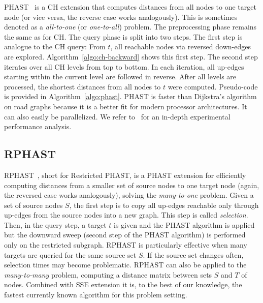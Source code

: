 \documentclass[manuscript,review]{acmart}
\begin{document}
PHAST~\cite{dgnw-phast-13} is a CH extension that computes distances from all nodes to one target node (or vice versa, the reverse case works analogously).
This is sometimes denoted as a \emph{all-to-one} (or \emph{one-to-all}) problem.
The preprocessing phase remains the same as for CH.
The query phase is split into two steps.
The first step is analogue to the CH query:
From $t$, all reachable nodes via reversed down-edges are explored.
Algorithm~\ref{algo:ch-backward} shows this first step.
The second step iterates over all CH levels from top to bottom.
In each iteration, all up-edges starting within the current level are followed in reverse.
After all levels are processed, the shortest distances from all nodes to $t$ were computed.
Pseudo-code is provided in Algorithm~\ref{algo:phast}.
PHAST is faster than Dijkstra's algorithm on road graphs because it is a better fit for modern processor architectures.
It can also easily be parallelized.
We refer to~\cite{dgnw-phast-13} for an in-depth experimental performance analysis.


\subsection{RPHAST}

RPHAST~\cite{delling_et_al:OASIcs:2011:3266}, short for Restricted PHAST, is a PHAST extension for efficiently computing distances from a smaller set of source nodes to one target node (again, the reversed case works analogously), solving the \emph{many-to-one} problem.
Given a set of source nodes $S$, the first step is to copy all up-edges reachable only through up-edges from the source nodes into a new graph.
This step is called \emph{selection}.
Then, in the query step, a target $t$ is given and the PHAST algorithm is applied but the downward sweep (second step of the PHAST algorithm) is performed only on the restricted subgraph.
RPHAST is particularly effective when many targets are queried for the same source set $S$.
If the source set changes often, selection times may become problematic.
RPHAST can also be applied to the \emph{many-to-many} problem, computing a distance matrix between sets $S$ and $T$ of nodes.
Combined with SSE extension it is, to the best of our knowledge, the fastest currently known algorithm for this problem setting.
\end{document}
